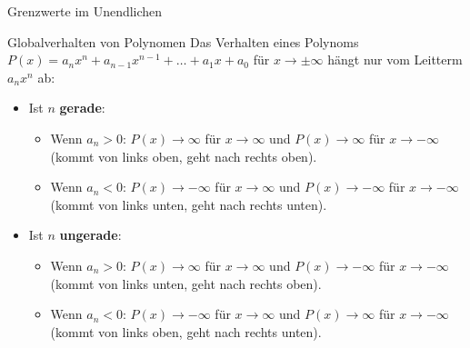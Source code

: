 \begin{loesungsumgebung}{Grenzwerte im Unendlichen}
\begin{merksatzumgebung}{Globalverhalten von Polynomen}
Das Verhalten eines Polynoms $P(x) = a_n x^n + a_{n-1}x^{n-1} + \dots + a_1 x + a_0$ für $x \to \pm\infty$ hängt nur vom Leitterm $a_n x^n$ ab:
\begin{itemize}
    \item Ist $n$ \textbf{gerade}:
    \begin{itemize}
        \item Wenn $a_n > 0$: $P(x) \to \infty$ für $x \to \infty$ und $P(x) \to \infty$ für $x \to -\infty$ (kommt von links oben, geht nach rechts oben).
        \item Wenn $a_n < 0$: $P(x) \to -\infty$ für $x \to \infty$ und $P(x) \to -\infty$ für $x \to -\infty$ (kommt von links unten, geht nach rechts unten).
    \end{itemize}
    \item Ist $n$ \textbf{ungerade}:
    \begin{itemize}
        \item Wenn $a_n > 0$: $P(x) \to \infty$ für $x \to \infty$ und $P(x) \to -\infty$ für $x \to -\infty$ (kommt von links unten, geht nach rechts oben).
        \item Wenn $a_n < 0$: $P(x) \to -\infty$ für $x \to \infty$ und $P(x) \to \infty$ für $x \to -\infty$ (kommt von links oben, geht nach rechts unten).
    \end{itemize}
\end{itemize}
\end{merksatzumgebung}

\end{loesungsumgebung}

